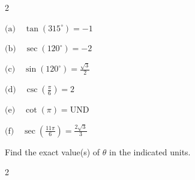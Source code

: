 \documentclass[11pt]{exam}
\begin{document}
\begin{questions}
\begin{multicols}{2}
\end{multicols}
\begin{solution}
\(\text{(a)} \quad \tan\left(315^\circ\right) = -1\)

\(\text{(b)} \quad \sec\left(120^\circ\right) = -2\)

\(\text{(c)} \quad \sin\left(120^\circ\right) = \frac{\sqrt{3}}{2}\)

\(\text{(d)} \quad \csc\left(\frac{\pi}{6}\right) = 2\)

\(\text{(e)} \quad \cot\left(\pi\right) = \text{UND}\)

\(\text{(f)} \quad \sec\left(\frac{11\pi}{6}\right) = \frac{2\sqrt{3}}{3}\)
\end{solution}

\newpage

\question[10] Find the exact value(s) of $\theta$ in the indicated units.
\begin{multicols}{2}
\begin{parts}
    \uplevel{\textbf{Degrees: $[0^\circ,360^\circ)$}} 
    \vspace{12pt}
    \part $\displaystyle \tan\theta \text{ is undefined}$, so $\theta=$ \hrulefill\\  
    \vspace{12pt}

\end{parts}
\end{multicols}
\end{questions}
\end{document}

